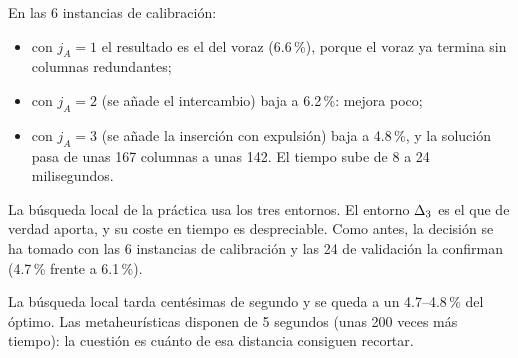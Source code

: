 

En las 6 instancias de calibración:
\begin{itemize}
  \item con $j_A=1$ el resultado es el del voraz (6.6\,\%), porque el voraz ya termina sin
        columnas redundantes;
  \item con $j_A=2$ (se añade el intercambio) baja a 6.2\,\%: mejora poco;
  \item con $j_A=3$ (se añade la inserción con expulsión) baja a 4.8\,\%, y la solución pasa
        de unas 167 columnas a unas 142. El tiempo sube de 8 a 24 milisegundos.
\end{itemize}

\begin{decision}[Decisión: $j_A=3$]
La búsqueda local de la práctica usa los tres entornos. El entorno $\Delta_{3}$ es el que de verdad
aporta, y su coste en tiempo es despreciable. Como antes, la decisión se ha tomado con las 6
instancias de calibración y las 24 de validación la confirman (4.7\,\% frente a 6.1\,\%).
\end{decision}

\begin{idea}
La búsqueda local tarda centésimas de segundo y se queda a un 4.7--4.8\,\% del óptimo. Las
metaheurísticas disponen de 5 segundos (unas 200 veces más tiempo): la cuestión es cuánto de
esa distancia consiguen recortar.
\end{idea}
